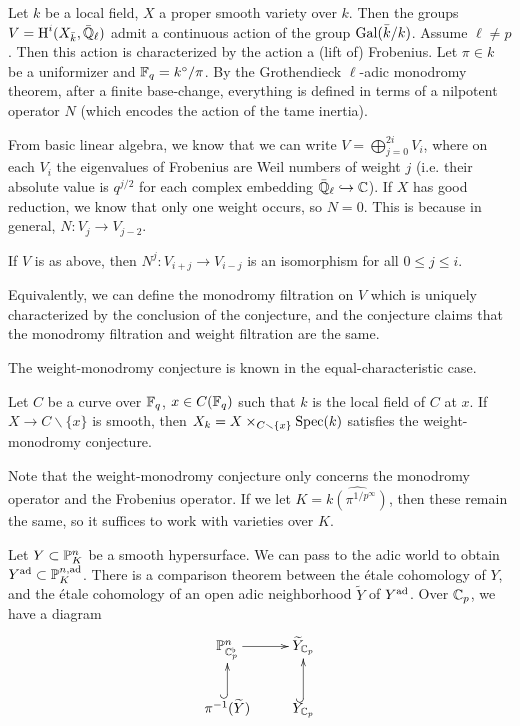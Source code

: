 Let $k$ be a local field, $X$ a proper smooth variety over $k$. Then the groups 
$V=\operatorname{H}^i(X_{\bar k},\bar{\mathbb{Q}}_\ell)$ admit a continuous action of the group 
$\operatorname{Gal}(\bar k/k)$. Assume $\ell\ne p$. Then this action is characterized by the 
action a (lift of) Frobenius. Let $\pi\in k$ be a uniformizer and 
$\mathbb{F}_q=k^\circ/\pi$. By the Grothendieck $\ell$-adic monodromy theorem, after a 
finite base-change, everything is defined in terms of a nilpotent operator 
$N$ (which encodes the action of the tame inertia). 

From basic linear algebra, we know that we can write 
$V=\bigoplus_{j=0}^{2 i} V_i$, where on each $V_i$ the eigenvalues of Frobenius 
are Weil numbers of weight $j$ (i.e. their absolute value is 
$q^{j/2}$ for each complex embedding $\bar{\mathbb{Q}}_\ell\hookrightarrow \mathbb{C}$). If 
$X$ has good reduction, we know that only one weight occurs, so $N=0$. 
This is because in general, $N:V_j \to V_{j-2}$. 

\begin{conjecture}[Deligne]
If $V$ is as above, then $N^j:V_{i+j} \to V_{i-j}$ is an isomorphism for all 
$0\leqslant j\leqslant i$. 
\end{conjecture}

Equivalently, we can define the monodromy filtration on $V$ which is uniquely 
characterized by the conclusion of the conjecture, and the conjecture claims 
that the monodromy filtration and weight filtration are the same. 

The weight-monodromy conjecture is known in the equal-characteristic case. 

\begin{theorem}[Deligne]
Let $C$ be a curve over $\mathbb{F}_q$, $x\in C(\mathbb{F}_q)$ such that 
$k$ is the local field of $C$ at $x$. If $X\to C\smallsetminus \{x\}$ is 
smooth, then $X_k=X\times_{C\smallsetminus \{x\}} \operatorname{Spec}(k)$ satisfies the 
weight-monodromy conjecture. 
\end{theorem}

Note that the weight-monodromy conjecture only concerns the monodromy operator 
and the Frobenius operator. If we let $K=\widehat{k(\pi^{1/p^\infty})}$, then these 
remain the same, so it suffices to work with varieties over $K$. 

Let $Y\subset \mathbb{P}_K^n$ be a smooth hypersurface. We can pass to the adic world 
to obtain $Y^{\textnormal{ad}}\subset \mathbb{P}_K^{n,\textnormal{ad}}$. There is a comparison theorem between 
the \'etale cohomology of $Y$, and the \'etale cohomology of an open adic 
neighborhood $\widetilde Y$ of $Y^{\textnormal{ad}}$. Over $\mathbb{C}_p$, we have a diagram 
\[\xymatrix{
  \dP_{\dC_p^\flat}^n \ar[r] 
    & \widetilde Y_{\dC_p} \\
  \pi^{-1}(\widetilde Y) \ar@{^{(}->}[u] 
    & Y_{\dC_p} \ar@{^{(}->}[u] 
}\]

